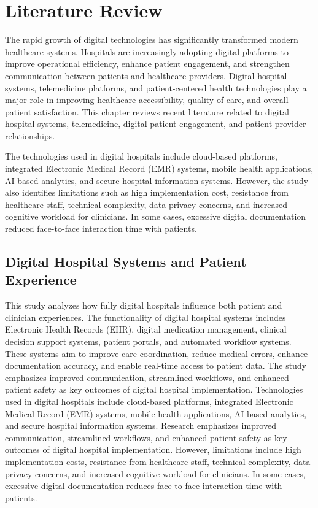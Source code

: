 \chapter{Literature Review}

The rapid growth of digital technologies has significantly transformed modern healthcare systems. Hospitals are increasingly adopting digital platforms to improve operational efficiency, enhance patient engagement, and strengthen communication between patients and healthcare providers. Digital hospital systems, telemedicine platforms, and patient-centered health technologies play a major role in improving healthcare accessibility, quality of care, and overall patient satisfaction. This chapter reviews recent literature related to digital hospital systems, telemedicine, digital patient engagement, and patient-provider relationships.

\noindent
The technologies used in digital hospitals include cloud-based platforms, integrated Electronic Medical Record (EMR) systems, mobile health applications, AI-based analytics, and secure hospital information systems. However, the study also identifies limitations such as high implementation cost, resistance from healthcare staff, technical complexity, data privacy concerns, and increased cognitive workload for clinicians. In some cases, excessive digital documentation reduced face-to-face interaction time with patients.

\section{Digital Hospital Systems and Patient Experience}

This study analyzes how fully digital hospitals influence both patient and clinician experiences. The functionality of digital hospital systems includes Electronic Health Records (EHR), digital medication management, clinical decision support systems, patient portals, and automated workflow systems. These systems aim to improve care coordination, reduce medical errors, enhance documentation accuracy, and enable real-time access to patient data. The study emphasizes improved communication, streamlined workflows, and enhanced patient safety as key outcomes of digital hospital implementation.
Technologies used in digital hospitals include cloud-based platforms, integrated Electronic Medical Record (EMR) systems, mobile health applications, AI-based analytics, and secure hospital information systems. Research emphasizes improved communication, streamlined workflows, and enhanced patient safety as key outcomes of digital hospital implementation. However, limitations include high implementation costs, resistance from healthcare staff, technical complexity, data privacy concerns, and increased cognitive workload for clinicians. In some cases, excessive digital documentation reduces face-to-face interaction time with patients.

